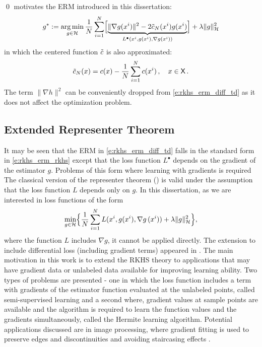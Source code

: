 \qed
{} motivates the ERM introduced in this dissertation:	
\begin{equation}
g^*  := \argmin_{g \in \clH} \frac{1}{N} \sum_{i=1}^N\Bigl[ \underbrace{\| \nabla g(x^i) \|^2 - 2 \tilc_N(x^i)g(x^i)}_{L^\bullet (x^i, g(x^i), \nabla g(x^i))}\Bigr] + \lambda \|g\|^2_\clH
\label{e:rkhs_erm_diff_td}
\end{equation}
in which the centered function $\tilde c$ is also approximated:
\[
\tilc_N(x) = c(x) - \frac{1}{N}  \sum_{i=1}^N  c(x^i)\,,\quad x\in\state\, .
\label{e:rkhs_tilc_N}
\]
The term $\| \nabla h \|^2$ can be conveniently dropped from \eqref{e:rkhs_erm_diff_td} as it does not affect the optimization problem.

\subsection{Extended Representer Theorem}
It may be seen that the ERM in \eqref{e:rkhs_erm_diff_td} falls in the standard form in \eqref{e:rkhs_erm_rkhs} except that the loss function $L^\bullet$ depends on the gradient of the estimator $g$. Problems of this form where learning with gradients is required The classical version of the representer theorem () is valid under the assumption that the loss function $L$ depends only on $g$. In this dissertation, as we are interested in loss functions of the form 
\begin{equation}
\min_{g\in\clH} \Bigl\{  \frac{1}{N} \sum_{i=1}^N L(x^i,  g(x^i), \nabla g\, (x^i))     + \lambda \| g\|^2_{\clH}  \Bigr\},
\label{e:rkhs_erm_rkhs_gradient}
\end{equation}
where the function $L$ includes $\nabla g$, it cannot be applied directly. The extension to include differential loss (including gradient terms) appeared in \cite{zho08}. The main motivation in this work is to extend the RKHS theory to applications that may have gradient data or unlabeled data available for improving learning ability. Two types of problems are presented - one in which the loss function includes a term with gradients of the estimator function evaluated at the unlabeled points, called semi-supervised learning and a second where, gradient values at sample points are available and the algorithm is required to learn the function values and the gradients simultaneously, called the Hermite learning algorithm. Potential applications discussed are in image processing, where gradient fitting is used to preserve edges and discontinuities and avoiding staircasing effects \cite{didsetste09}. 
 
